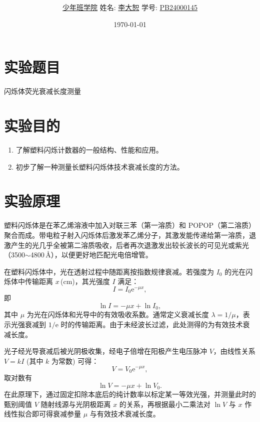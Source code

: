 \documentclass[12pt,a4paper]{article}
\title{\Huge{\textbf{\uuline{实\ 验\ 报\ 告}}}}
\author{\uline{少年班学院} \quad 姓名: \uline{李大恕} \quad 学号: \uline{PB24000145}}
\date{\today}
\begin{document}
\maketitle

\section{实验题目}
闪烁体荧光衰减长度测量

\section{实验目的}
\begin{enumerate}
    \item 了解塑料闪烁计数器的一般结构、性能和应用。
    \item 初步了解一种测量长塑料闪烁体技术衰减长度的方法。
\end{enumerate}

\section{实验原理}
塑料闪烁体是在苯乙烯溶液中加入对联三苯（第一溶质）和 POPOP（第二溶质）聚合而成。带电粒子射入闪烁体后激发苯乙烯分子，其激发能传递给第一溶质，退激产生的光几乎全被第二溶质吸收，后者再次退激发出较长波长的可见光或紫光（3500$\sim$4800\,\AA），以便更好地匹配光电倍增管。

在塑料闪烁体中，光在透射过程中随距离按指数规律衰减。若强度为 $I_0$ 的光在闪烁体中传输距离 $x$\,(\unit{\centi\meter})，其光强度 $I$ 满足：
\begin{equation}
    I = I_0 \mathrm{e}^{-\mu x},
\end{equation}
即
\begin{equation}
    \ln I = -\mu x + \ln I_0,
\end{equation}
其中 $\mu$ 为光在闪烁体和光导中的有效吸收系数。通常定义衰减长度 $\lambda = 1/\mu$，表示光强衰减到 $1/\mathrm{e}$ 时的传输距离。由于未经波长过滤，此处测得的为有效技术衰减长度。

光子经光导衰减后被光阴极收集，经电子倍增在阳极产生电压脉冲 $V$，由线性关系 $V = kI$ (其中 $k$ 为常数) 可得：
\begin{equation}
    V = V_0 \mathrm{e}^{-\mu x},
\end{equation}
取对数有
\begin{equation}
    \ln V = -\mu x + \ln V_0.
    \label{eq:lnV}
\end{equation}
在此原理下，通过固定扣除本底后的纯计数率以标定某一等效光强，并测量此时的甄别阈值 $V$ 随射线源与光阴极距离 $x$ 的关系，再根据最小二乘法对 $\ln V$ 与 $x$ 作线性拟合即可得衰减参量 $\mu$ 与有效技术衰减长度。
\end{document}
